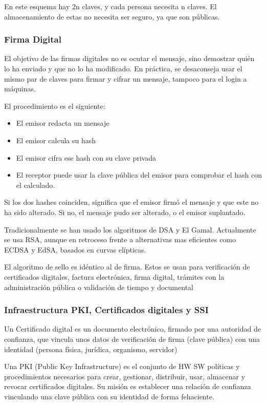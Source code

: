     En este esquema hay 2n claves, y cada persona necesita n claves. El almacenamiento de estas no necesita ser seguro, ya que son públicas.
    
    \subsubsection{Firma Digital}
        El objetivo de las firmas digitales no es ocutar el mensaje, sino demostrar quién lo ha enviado y que no lo ha modificado. En práctica, se desaconseja usar el mismo par de claves para firmar y cifrar un mensaje, tampoco para el login a máquinas.

        El procedimiento es el siguiente:
        \begin{itemize}
            \item El emisor redacta un mensaje
            \item El emisor calcula su hash
            \item El emisor cifra ese hash con su clave privada
            \item El receptor puede usar la clave pública del emisor para comprobar el hash con el calculado.
        \end{itemize}
        Si los dos hashes coinciden, significa que el emisor firmó el mensaje y que este no ha sido alterado. Si no, el mensaje pudo ser alterado, o el emisor suplantado.

        Tradicionalmente se han usado los algoritmos de DSA y El Gamal. Actualmente se usa RSA, aunque en retroceso frente a alternativas mas eficientes como ECDSA y EdSA, basados en curvas elípticas.

        El algoritmo de sello es idéntico al de firma. Estos se usan para verificación de certificados digitales, factura electrónica, firma digital, trámites con la administración pública o validación de tiempo y documental

    \subsubsection{Infraestructura PKI, Certificados digitales y SSI}
        Un Certificado digital es un documento electrónico, firmado por una autoridad de confianza, que vincula unos datos de verificación de firma (clave pública) con una identidad (persona física, jurídica, organismo, servidor)

        Una PKI (Public Key Infrastructure) es el conjunto de HW SW políticas y procedimientos necesarios para crear, gestionar, distribuir, usar, almacenar y revocar certificados digitales. Su misión es establecer una relación de confianza vinculando una clave pública con su identidad de forma fehaciente.


